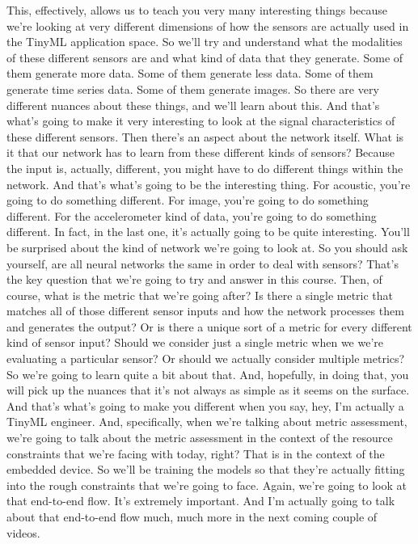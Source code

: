 This, effectively, allows us to teach you very many interesting things
because we're looking at very different dimensions of how
the sensors are actually used in the TinyML application space.
So we'll try and understand what the modalities of these different sensors
are and what kind of data that they generate.
Some of them generate more data.
Some of them generate less data.
Some of them generate time series data.
Some of them generate images.
So there are very different nuances about these things,
and we'll learn about this.
And that's what's going to make it very interesting to look
at the signal characteristics of these different sensors.
Then there's an aspect about the network itself.
What is it that our network has to learn from these different kinds of sensors?
Because the input is, actually, different,
you might have to do different things within the network.
And that's what's going to be the interesting thing.
For acoustic, you're going to do something different.
For image, you're going to do something different.
For the accelerometer kind of data, you're going to do something different.
In fact, in the last one, it's actually going to be quite interesting.
You'll be surprised about the kind of network we're going to look at.
So you should ask yourself, are all neural networks the same in order
to deal with sensors?
That's the key question that we're going to try and answer in this course.
Then, of course, what is the metric that we're going after?
Is there a single metric that matches all of those different sensor inputs
and how the network processes them and generates the output?
Or is there a unique sort of a metric for every different kind of sensor
input?
Should we consider just a single metric when we
we're evaluating a particular sensor?
Or should we actually consider multiple metrics?
So we're going to learn quite a bit about that.
And, hopefully, in doing that, you will pick up the nuances
that it's not always as simple as it seems on the surface.
And that's what's going to make you different when you say,
hey, I'm actually a TinyML engineer.
And, specifically, when we're talking about metric assessment,
we're going to talk about the metric assessment
in the context of the resource constraints
that we're facing with today, right?
That is in the context of the embedded device.
So we'll be training the models so that they're actually fitting
into the rough constraints that we're going to face.
Again, we're going to look at that end-to-end flow.
It's extremely important.
And I'm actually going to talk about that end-to-end flow much,
much more in the next coming couple of videos.
